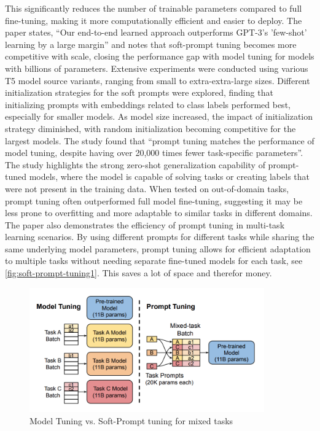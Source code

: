 This significantly reduces the number of trainable parameters compared to full fine-tuning, making it more computationally efficient and easier to deploy. The paper states, \enquote{Our end-to-end learned approach outperforms GPT-3’s 'few-shot' learning by a large margin} and notes that soft-prompt tuning becomes more competitive with scale, closing the performance gap with model tuning for models with billions of parameters. Extensive experiments were conducted using various T5 model \textcolor{bhtRed}{source} variants, ranging from small to extra-extra-large sizes. Different initialization strategies for the soft prompts were explored, finding that initializing prompts with embeddings related to class labels performed best, especially for smaller models. As model size increased, the impact of initialization strategy diminished, with random initialization becoming competitive for the largest models. The study found that \enquote{prompt tuning matches the performance of model tuning, despite having over 20,000 times fewer task-specific parameters}. The study highlights the strong zero-shot generalization capability of prompt-tuned models, where the model is capable of solving tasks or creating labels that were not present in the training data. When tested on out-of-domain tasks, prompt tuning often outperformed full model fine-tuning, suggesting it may be less prone to overfitting and more adaptable to similar tasks in different domains. The paper also demonstrates the efficiency of prompt tuning in multi-task learning scenarios. By using different prompts for different tasks while sharing the same underlying model parameters, prompt tuning allows for efficient adaptation to multiple tasks without needing separate fine-tuned models for each task, see \autoref{fig:soft-prompt-tuning1}. This saves a lot of space and therefor money.

\begin{figure}[h]
    \centering
    \includegraphics[width=0.9\textwidth]{bhtThesis/main/2Background/images/prompt-tuning.png}
    \caption{Model Tuning vs. Soft-Prompt tuning for mixed tasks \citep{prompt-tuning}}
    \label{fig:soft-prompt-tuning1}
\end{figure}

